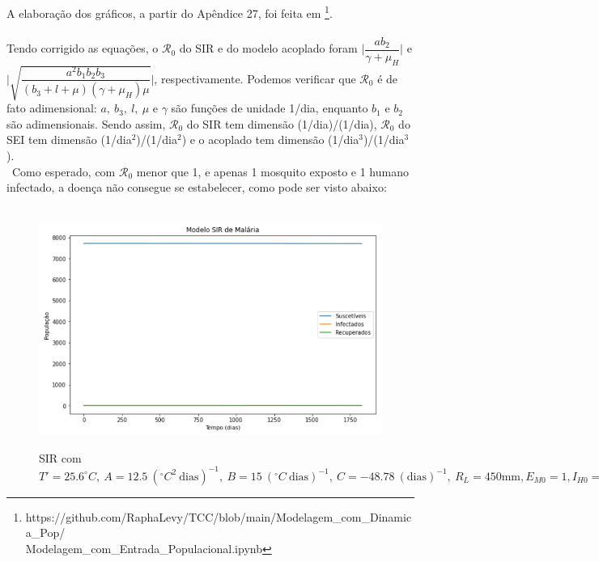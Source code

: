 \documentclass[12pt]{article}
\begin{document}
A elaboração dos gráficos, a partir do Apêndice 27, foi feita em \footnote{https://github.com/RaphaLevy/TCC/blob/main/Modelagem\_com\_Dinamica\_Pop/ \\
Modelagem\_com\_Entrada\_Populacional.ipynb}.
\\\\
Tendo corrigido as equações, o $\mathcal{R}_0$ do SIR e do modelo acoplado 
foram $\Big | \dfrac{ab_2}{\gamma + \mu_H}\Big | $ e 
$\Big | \sqrt{\dfrac{a^2b_1b_2b_3}{(b_3+l+\mu)(\gamma+\mu_H)\mu}}\Big | $, respectivamente. Podemos verificar que $\mathcal{R}_0$ é de fato adimensional: $a, \ b_3, \ l, \ \mu$ e $\gamma$ são funções de unidade 1/dia, enquanto $b_1$ e $b_2$ são adimensionais. Sendo assim, $\mathcal{R}_0$ do SIR tem dimensão (1/dia)/(1/dia), $\mathcal{R}_0$ do SEI tem dimensão (1/dia$^2$)/(1/dia$^2$) e o acoplado tem dimensão (1/dia$^3$)/(1/dia$^3$). 
\\\
Como esperado, com $\mathcal{R}_0$ menor que 1, e apenas 1 mosquito exposto e 
1 humano infectado, a doença não consegue se estabelecer, como pode ser visto abaixo:
\begin{figure}[!ht]
        \centering
        \hbox{\hspace{2.5em} \includegraphics[scale=0.7] {SIR_Entrada_Pop_1_1_Infect.png}}
        \caption{SIR com $T'=25.6 ^\circ C, \ A=12.5 \ (^\circ C^2 \ \text{dias})^{-1}, \ B=15 \ (^\circ C \ \text{dias})^{-1}, \ C=-48.78 \ (\text{dias})^{-1}, \ R_L=450 \text{mm}, E_{M0}=1, I_{H0}=1$} 
\end{figure} 
\end{document}
